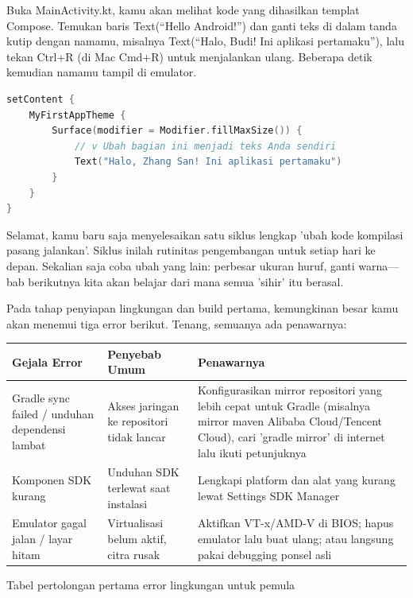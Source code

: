 
Buka MainActivity.kt, kamu akan melihat kode yang dihasilkan templat Compose. Temukan baris Text(“Hello Android!”) dan ganti teks di dalam tanda kutip dengan namamu, misalnya Text(“Halo, Budi! Ini aplikasi pertamaku”), lalu tekan Ctrl+R (di Mac Cmd+R) untuk menjalankan ulang. Beberapa detik kemudian namamu tampil di emulator.

\begin{lstlisting}[language=Kotlin]
setContent {
    MyFirstAppTheme {
        Surface(modifier = Modifier.fillMaxSize()) {
            // v Ubah bagian ini menjadi teks Anda sendiri
            Text("Halo, Zhang San! Ini aplikasi pertamaku")
        }
    }
}
\end{lstlisting}

Selamat, kamu baru saja menyelesaikan satu siklus lengkap 'ubah kode kompilasi pasang jalankan'. Siklus inilah rutinitas pengembangan untuk setiap hari ke depan. Sekalian saja coba ubah yang lain: perbesar ukuran huruf, ganti warna—bab berikutnya kita akan belajar dari mana semua 'sihir' itu berasal.


Pada tahap penyiapan lingkungan dan build pertama, kemungkinan besar kamu akan menemui tiga error berikut. Tenang, semuanya ada penawarnya:

\begin{center}
\begin{tabularx}{\linewidth}{|X|X|X|}
\hline
\textbf{Gejala Error} & \textbf{Penyebab Umum} & \textbf{Penawarnya} \tabularnewline
\hline
Gradle sync failed / unduhan dependensi lambat & Akses jaringan ke repositori tidak lancar & Konfigurasikan mirror repositori yang lebih cepat untuk Gradle (misalnya mirror maven Alibaba Cloud/Tencent Cloud), cari 'gradle mirror' di internet lalu ikuti petunjuknya \tabularnewline
Komponen SDK kurang & Unduhan SDK terlewat saat instalasi & Lengkapi platform dan alat yang kurang lewat Settings SDK Manager \tabularnewline
Emulator gagal jalan / layar hitam & Virtualisasi belum aktif, citra rusak & Aktifkan VT-x/AMD-V di BIOS; hapus emulator lalu buat ulang; atau langsung pakai debugging ponsel asli \tabularnewline
\hline
\end{tabularx}
\end{center}

\begin{center}\small\color{gray}Tabel pertolongan pertama error lingkungan untuk pemula\end{center}

